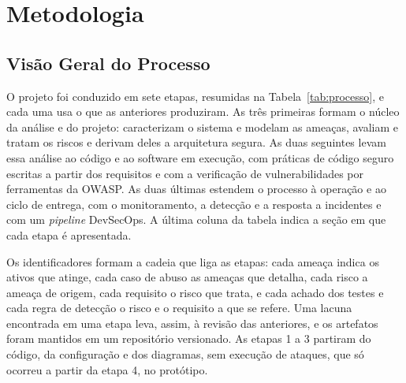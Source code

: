 \documentclass[conference]{IEEEtran}
\begin{document}
\section{Metodologia}
\label{sec:metodologia}

\subsection{Visão Geral do Processo}
\label{subsec:processo}

O projeto foi conduzido em sete etapas, resumidas na Tabela~\ref{tab:processo}, e cada uma usa o que as anteriores produziram. As três primeiras formam o núcleo da análise e do projeto: caracterizam o sistema e modelam as ameaças, avaliam e tratam os riscos e derivam deles a arquitetura segura. As duas seguintes levam essa análise ao código e ao software em execução, com práticas de código seguro escritas a partir dos requisitos e com a verificação de vulnerabilidades por ferramentas da OWASP. As duas últimas estendem o processo à operação e ao ciclo de entrega, com o monitoramento, a detecção e a resposta a incidentes e com um \textit{pipeline} DevSecOps. A última coluna da tabela indica a seção em que cada etapa é apresentada.

Os identificadores formam a cadeia que liga as etapas: cada ameaça indica os ativos que atinge, cada caso de abuso as ameaças que detalha, cada risco a ameaça de origem, cada requisito o risco que trata, e cada achado dos testes e cada regra de detecção o risco e o requisito a que se refere. Uma lacuna encontrada em uma etapa leva, assim, à revisão das anteriores, e os artefatos foram mantidos em um repositório versionado. As etapas 1 a 3 partiram do código, da configuração e dos diagramas, sem execução de ataques, que só ocorreu a partir da etapa 4, no protótipo.
\end{document}
